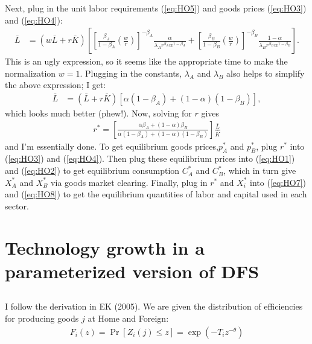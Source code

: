 \documentclass[12pt]{article}
\begin{document}
Next, plug in the unit labor requirements (\ref{eq:HO5}) and goods prices (\ref{eq:HO3}) and (\ref{eq:HO4}):
\begin{align*}
 \bar L&= (w\bar L + r\bar K)\left[\left[ \frac{\beta_A}{1-\beta_A}\left(\frac{w}{r}\right)\right]^{-\beta_A} \frac{\alpha}{\lambda_A r^{\beta_A}w^{1-\beta_A} } + \left[ \frac{\beta_B}{1-\beta_B}\left(\frac{w}{r}\right)\right]^{-\beta_B}  \frac{1-\alpha}{\lambda_B r^{\beta_B}w^{1-\beta_B} }\right].
\end{align*}
This is an ugly expression, so it seems like the appropriate time to make the normalization $w = 1$. Plugging in the constants, $\lambda_A$ and $\lambda_B$ also helps to simplify the above expression; I get:
\begin{align*}
 \bar L&= (\bar L + r\bar K)\left[\alpha(1-\beta_A) + (1-\alpha)(1-\beta_B)\right],
\end{align*}
which looks much better (phew!). Now, solving for $r$ gives
\begin{align}
r^* = \left[\frac{\alpha\beta_A + (1-\alpha)\beta_B}{\alpha(1-\beta_A) + (1-\alpha)(1-\beta_B)}\right] \frac{\bar L}{\bar K} \label{eq:12}
\end{align}
and I'm essentially done. To get equilibrium goods prices,$p^*_A$ and $p^*_B$, plug $r^*$ into (\ref{eq:HO3}) and (\ref{eq:HO4}). Then plug these equilibrium prices into (\ref{eq:HO1}) and (\ref{eq:HO2}) to get equilibrium consumption $C_A^*$ and $C_B^*$, which in turn give $X_A^*$ and $X_B^*$ via goods market clearing. Finally, plug in $r^*$ and $X_i^*$ into (\ref{eq:HO7}) and (\ref{eq:HO8}) to get the equilibrium quantities of labor and capital used in each sector.

\newpage

\section{Technology growth in a parameterized version of DFS}

\subsection{}
I follow the derivation in EK (2005). We are given the distribution of efficiencies for producing goods $j$ at Home and Foreign:
\begin{align*}
F_i(z)=\Pr[Z_i(j) \leq z ] = \exp(-T_iz^{-\theta})
\end{align*}

\iffalse
Now, if we pick some random $j \in [0,1]$, the probability distribution of its efficiency, $Z_i(j)$, is obviously same as above. Accordingly, we can order goods such that
\begin{align*}
j &= \exp(-T_iz_i(j)^{-\theta})\\
\implies z_i(j) &= \left(-\frac{T_i}{\ln j}\right)^{-1/\theta}.
\end{align*}
(Essentially, think of the index $j$ as the vertical axis of the CDF above).\\
\fi
\end{document}
